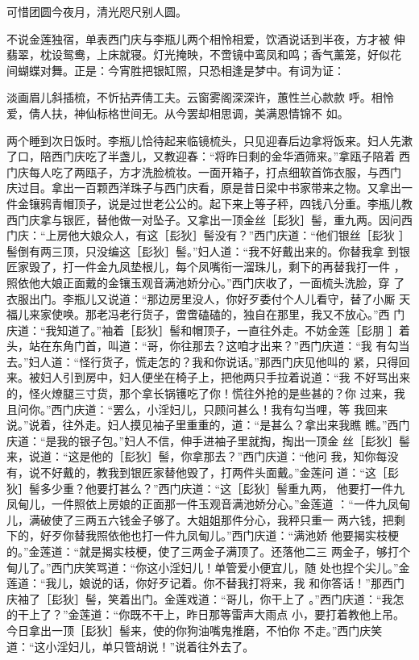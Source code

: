 可惜团圆今夜月，清光咫尺别人圆。

不说金莲独宿，单表西门庆与李瓶儿两个相怜相爱，饮酒说话到半夜，方才被
伸翡翠，枕设鸳鸯，上床就寝。灯光掩映，不啻镜中鸾凤和鸣；香气薰笼，好似花
间蝴蝶对舞。正是：今宵胜把银缸照，只恐相逢是梦中。有词为证：

淡画眉儿斜插梳，不忻拈弄倩工夫。云窗雾阁深深许，蕙性兰心款款
呼。相怜爱，倩人扶，神仙标格世间无。从今罢却相思调，美满恩情锦不
如。

两个睡到次日饭时。李瓶儿恰待起来临镜梳头，只见迎春后边拿将饭来。妇人先漱
了口，陪西门庆吃了半盏儿，又教迎春：“将昨日剩的金华酒筛来。”拿瓯子陪着
西门庆每人吃了两瓯子，方才洗脸梳妆。一面开箱子，打点细软首饰衣服，与西门
庆过目。拿出一百颗西洋珠子与西门庆看，原是昔日梁中书家带来之物。又拿出一
件金镶鸦青帽顶子，说是过世老公公的。起下来上等子秤，四钱八分重。李瓶儿教
西门庆拿与银匠，替他做一对坠子。又拿出一顶金丝［髟狄］髻，重九两。因问西
门庆：“上房他大娘众人，有这［髟狄］髻没有？”西门庆道：“他们银丝［髟狄
］髻倒有两三顶，只没编这［髟狄］髻。”妇人道：“我不好戴出来的。你替我拿
到银匠家毁了，打一件金九凤垫根儿，每个凤嘴衔一溜珠儿，剩下的再替我打一件
，照依他大娘正面戴的金镶玉观音满池娇分心。”西门庆收了，一面梳头洗脸，穿
了衣服出门。李瓶儿又说道：“那边房里没人，你好歹委付个人儿看守，替了小厮
天福儿来家使唤。那老冯老行货子，啻啻磕磕的，独自在那里，我又不放心。”西
门庆道：“我知道了。”袖着［髟狄］髻和帽顶子，一直往外走。不妨金莲［髟朋
］着头，站在东角门首，叫道：“哥，你往那去？这咱才出来？”西门庆道：“我
有勾当去。”妇人道：“怪行货子，慌走怎的？我和你说话。”那西门庆见他叫的
紧，只得回来。被妇人引到房中，妇人便坐在椅子上，把他两只手拉着说道：“我
不好骂出来的，怪火燎腿三寸货，那个拿长锅镬吃了你！慌往外抢的是些甚的？你
过来，我且问你。”西门庆道：“罢么，小淫妇儿，只顾问甚么！我有勾当哩，等
我回来说。”说着，往外走。妇人摸见袖子里重重的，道：“是甚么？拿出来我瞧
瞧。”西门庆道：“是我的银子包。”妇人不信，伸手进袖子里就掏，掏出一顶金
丝［髟狄］髻来，说道：“这是他的［髟狄］髻，你拿那去？”西门庆道：“他问
我，知你每没有，说不好戴的，教我到银匠家替他毁了，打两件头面戴。”金莲问
道：“这［髟狄］髻多少重？他要打甚么？”西门庆道：“这［髟狄］髻重九两，
他要打一件九凤甸儿，一件照依上房娘的正面那一件玉观音满池娇分心。”金莲道
：“一件九凤甸儿，满破使了三两五六钱金子够了。大姐姐那件分心，我秤只重一
两六钱，把剩下的，好歹你替我照依他也打一件九凤甸儿。”西门庆道：“满池娇
他要揭实枝梗的。”金莲道：“就是揭实枝梗，使了三两金子满顶了。还落他二三
两金子，够打个甸儿了。”西门庆笑骂道：“你这小淫妇儿！单管爱小便宜儿，随
处也捏个尖儿。”金莲道：“我儿，娘说的话，你好歹记着。你不替我打将来，我
和你答话！”那西门庆袖了［髟狄］髻，笑着出门。金莲戏道：“哥儿，你干上了
。”西门庆道：“我怎的干上了？”金莲道：“你既不干上，昨日那等雷声大雨点
小，要打着教他上吊。今日拿出一顶［髟狄］髻来，使的你狗油嘴鬼推磨，不怕你
不走。”西门庆笑道：“这小淫妇儿，单只管胡说！”说着往外去了。

